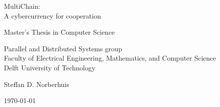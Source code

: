 \begin{titlepage}

  \begin{center}
  \null\vfill
    \begin{center}
    \LARGE{MultiChain:\\
		A cybercurrency for cooperation}
    \end{center}

    \vspace{3cm}

    \begin{large}
    Master's Thesis in Computer Science
    \end{large}

    \vspace{1.5cm}

    \begin{normalsize}
    Parallel and Distributed Systems group\\
    Faculty of Electrical Engineering, Mathematics, and Computer Science\\
    Delft University of Technology
    \end{normalsize}

    \vspace{2.0cm}

    \begin{normalsize}
    Steffan D. Norberhuis
    \end{normalsize}

    \vspace{1.0cm}

    \today            %

  \vfill
  \end{center}

\end{titlepage}


